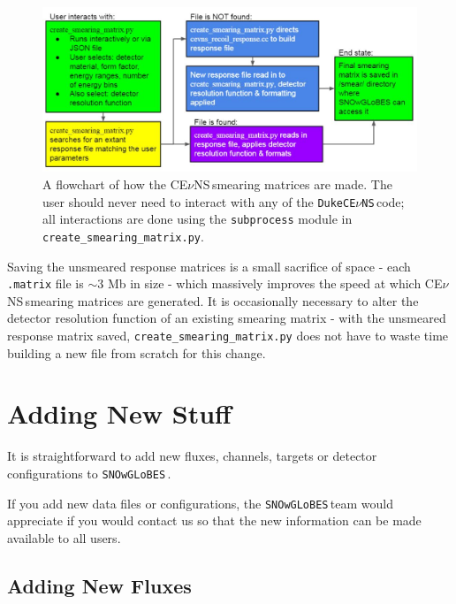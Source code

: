 \documentclass{article}
\newcommand{\cev}{CE$\nu$NS\,}
\newcommand{\snow}{\texttt{SNOwGLoBES}\,}
\newcommand{\dukecev}{\texttt{DukeCE$\nu$NS}\,}
\begin{document}
\begin{figure}[ht]
    \centering
    \includegraphics[width=\textwidth,keepaspectratio]{CEvNSmatrixCreationDiagram.JPG}
    \caption{A flowchart of how the \cev smearing matrices are made. The user should never need to interact with any of the \dukecev code; all interactions are done using the \texttt{subprocess} module in \texttt{create\_smearing\_matrix.py}.}
    \label{fig:cevnsmatrixcreation}
\end{figure}

Saving the unsmeared response matrices is a small sacrifice of space - each \texttt{.matrix} file is $\sim 3$ Mb in size - which massively improves the speed at which \cev smearing matrices are generated. It is occasionally necessary to alter the detector resolution function of an existing smearing matrix - with the unsmeared response matrix saved, \texttt{create\_smearing\_matrix.py} does not have to waste time building a new file from scratch for this change.


\section{Adding New Stuff} \label{sec:newstuff}

It is straightforward to add new fluxes, channels, targets or detector configurations to \snow.

If you add new data files or configurations, the \snow team would appreciate if you would contact us so that the new information can be made available to all users.

\subsection{Adding New Fluxes}
\end{document}
